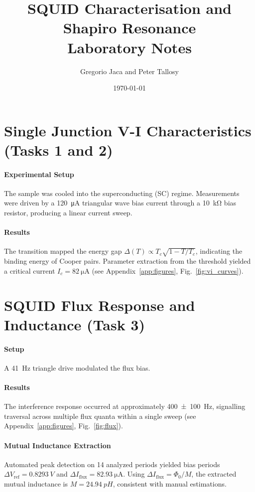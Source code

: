 \documentclass[10pt, a4paper]{article}
\title{\vspace{-1.5cm}\Large\bfseries\sffamily SQUID Characterisation and Shapiro Resonance\\ \large \normalfont Laboratory Notes}
\author{Gregorio Jaca and Peter Tallosy}
\date{\today}
\begin{document}
\maketitle

\section{Single Junction V-I Characteristics (Tasks 1 and 2)}
\paragraph{Experimental Setup} The sample was cooled into the superconducting (SC) regime. Measurements were driven by a \SI{120}{\micro\ampere} triangular wave bias current through a \SI{10}{\kilo\ohm} bias resistor, producing a linear current sweep.
\paragraph{Results} The transition mapped the energy gap $\Delta(T) \propto T_c \sqrt{1 - T/T_c}$, indicating the binding energy of Cooper pairs. Parameter extraction from the threshold yielded a critical current $I_c = \SI{82}{\micro\ampere}$ (see Appendix~\ref{app:figures}, Fig.~\ref{fig:vi_curves}). 

\section{SQUID Flux Response and Inductance (Task 3)}
\paragraph{Setup} A \SI{41}{Hz} triangle drive modulated the flux bias.
\paragraph{Results} The interference response occurred at approximately \SI{400 \pm 100}{Hz}, signalling traversal across multiple flux quanta within a single sweep (see Appendix~\ref{app:figures}, Fig.~\ref{fig:flux}).
\paragraph{Mutual Inductance Extraction} Automated peak detection on 14 analyzed periods yielded bias periods $\Delta V_{\mathrm{ref}} = \SI{0.8293}{V}$ and $\Delta I_{\mathrm{flux}} = \SI{82.93}{\micro\ampere}$. Using $\Delta I_{\mathrm{flux}} = \Phi_0/M$, the extracted mutual inductance is $M = \SI{24.94}{pH}$, consistent with manual estimations.
\end{document}
